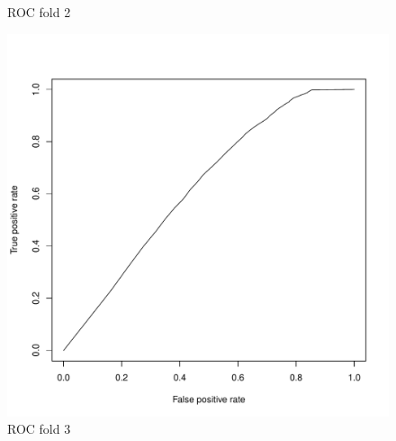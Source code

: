 \documentclass{article}\usepackage[]{graphicx}\usepackage[]{color}
\begin{document}
\begin{figure}[h]
  \caption{ROC fold 2}\label{}
\endminipage\hfill
{}%
  \includegraphics[width=\linewidth]{ROC_block3.pdf}
  \caption{ROC fold 3}\label{}
\endminipage
\end{figure}
\end{document}
